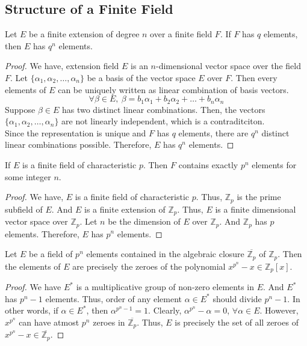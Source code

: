 \subsection{Structure of a Finite Field}
\begin{theorem}
	Let $E$ be a finite extension of degree $n$ over a finite field $F$.
	If $F$ has $q$ elements, then $E$ has $q^n$ elements.
\end{theorem}
\begin{proof}
	We have, extension field $E$ is an $n$-dimensional vector space over the field $F$.
	Let $\{ \alpha_1, \alpha_2,\dots, \alpha_n \}$ be a basis of the vector space $E$ over $F$.
	Then every elements of $E$ can be uniquely written as linear combination of basis vectors.
\begin{equation*}
 	\forall \beta \in E,\ \beta = b_1 \alpha_1 + b_2 \alpha_2 + \dots + b_n \alpha_n
\end{equation*}
	Suppose $\beta \in E$ has two distinct linear combinations.
	Then, the vectors $\{ \alpha_1, \alpha_2,\dots,\alpha_n\}$ are not linearly independent, which is a contraditciton.\\
	
	Since the representation is unique and $F$ has $q$ elements, there are $q^n$ distinct linear combinations possible.
	Therefore, $E$ has $q^n$ elements.
\end{proof}

\begin{corollary}
	If $E$ is a finite field of characteristic $p$.
	Then $F$ contains exactly $p^n$ elements for some integer $n$.
\end{corollary}
\begin{proof}
	We have, $E$ is a finite field of characteristic $p$.
	Thus, $\mathbb{Z}_p$ is the prime subfield of $E$.
	And $E$ is a finite extension of $\mathbb{Z}_p$.
	Thus, $E$ is a finite dimensional vector space over $\mathbb{Z}_p$.
	Let $n$ be the dimension of $E$ over $\mathbb{Z}_p$.
	And $\mathbb{Z}_p$ has $p$ elements.
	Therefore, $E$ has $p^n$ elements.
\end{proof}

\begin{theorem}
	Let $E$ be a field of $p^n$ elements contained in the algebraic closure $\overline{\mathbb{Z}_p}$ of $\mathbb{Z}_p$.
	Then the elements of $E$ are precisely the zeroes of the polynomial $x^{p^n}-x \in \mathbb{Z}_p[x]$.
\end{theorem}
\begin{proof}
	We have $E^\ast$ is a multiplicative group of non-zero elements in $E$.
	And $E^\ast$ has $p^n-1$ elements.
	Thus, order of any element $\alpha \in E^\ast$ should divide $p^n-1$.
	In other words, if $\alpha \in E^\ast$, then $\alpha^{p^n-1} = 1$.
	Clearly, $\alpha^{p^n} - \alpha = 0$, $\forall \alpha \in E$.
	However, $x^{p^n}$ can have atmost $p^n$ zeroes in $\overline{\mathbb{Z}_p}$.
	Thus, $E$ is precisely the set of all zeroes of $x^{p^n}-x \in \overline{\mathbb{Z}_p}$.
\end{proof}

